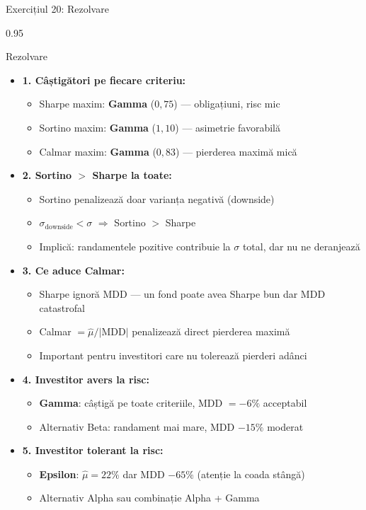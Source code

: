 \documentclass[9pt, aspectratio=169, t]{beamer}
\begin{document}
\begin{frame}[shrink=25]{Exercițiul 20: Rezolvare}
\begin{cminipage}{0.95\textwidth}
\begin{exampleblock}{Rezolvare}
\begin{itemize}\setlength{\itemsep}{0pt}
    \item \textbf{1. Câștigători pe fiecare criteriu:}
    \begin{itemize}\setlength{\itemsep}{0pt}
        \item Sharpe maxim: \textbf{Gamma} ($0{,}75$) --- obligațiuni, risc mic
        \item Sortino maxim: \textbf{Gamma} ($1{,}10$) --- asimetrie favorabilă
        \item Calmar maxim: \textbf{Gamma} ($0{,}83$) --- pierderea maximă mică
    \end{itemize}
    \item \textbf{2. Sortino $>$ Sharpe la toate:}
    \begin{itemize}\setlength{\itemsep}{0pt}
        \item Sortino penalizează doar varianța negativă (downside)
        \item $\sigma_{\text{downside}} < \sigma$ $\Rightarrow$ Sortino $>$ Sharpe
        \item Implică: randamentele pozitive contribuie la $\sigma$ total, dar nu ne deranjează
    \end{itemize}
    \item \textbf{3. Ce aduce Calmar:}
    \begin{itemize}\setlength{\itemsep}{0pt}
        \item Sharpe ignoră MDD --- un fond poate avea Sharpe bun dar MDD catastrofal
        \item Calmar $= \hat\mu/|\text{MDD}|$ penalizează direct pierderea maximă
        \item Important pentru investitori care nu tolerează pierderi adânci
    \end{itemize}
    \item \textbf{4. Investitor avers la risc:}
    \begin{itemize}\setlength{\itemsep}{0pt}
        \item \textbf{Gamma}: câștigă pe toate criteriile, MDD $= -6\%$ acceptabil
        \item Alternativ Beta: randament mai mare, MDD $-15\%$ moderat
    \end{itemize}
    \item \textbf{5. Investitor tolerant la risc:}
    \begin{itemize}\setlength{\itemsep}{0pt}
        \item \textbf{Epsilon}: $\hat\mu = 22\%$ dar MDD $-65\%$ (atenție la coada stângă)
        \item Alternativ Alpha sau combinație Alpha + Gamma
    \end{itemize}
\end{itemize}
\end{exampleblock}
\end{cminipage}
\end{frame}
\end{document}
